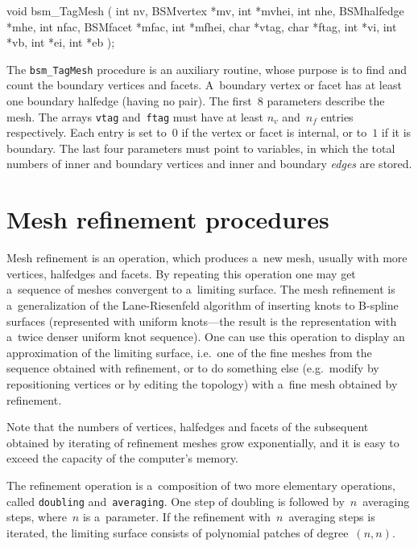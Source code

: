 \medskip
\begin{listingC}
void bsm_TagMesh ( int nv, BSMvertex *mv, int *mvhei,
                   int nhe, BSMhalfedge *mhe,
                   int nfac, BSMfacet *mfac, int *mfhei,
                   char *vtag, char *ftag,
                   int *vi, int *vb, int *ei, int *eb );
\end{listingC}
The \texttt{bsm\_TagMesh} procedure is an auxiliary routine, whose purpose
is to find and count the boundary vertices and facets. A~boundary vertex or
facet has at least one boundary halfedge (having no pair). The first~$8$
parameters describe the mesh. The arrays \texttt{vtag} and~\texttt{ftag}
must have at least $n_v$ and~$n_f$ entries respectively. Each entry is set
to~$0$ if the vertex or facet is internal, or to~$1$ if it is boundary.
The last four parameters must point to variables, in which the total numbers
of inner and boundary vertices and inner and boundary \emph{edges} are stored.


\section{\label{sect:bsmesh:refinement}Mesh refinement procedures}

Mesh refinement is an operation, which produces a~new mesh, usually with
more vertices, halfedges and facets. By repeating this operation one may get
a~sequence of meshes convergent to a~limiting surface. The mesh refinement
is a~generalization of the Lane-Riesenfeld algorithm of inserting knots to
B-spline surfaces (represented with uniform knots---the result is the
representation with a~twice denser uniform knot sequence). One can use this
operation to display an approximation of the limiting surface, i.e.\ one of
the fine meshes from the sequence obtained with refinement, or to do
something else (e.g.\ modify by repositioning vertices or by editing the
topology) with a~fine mesh obtained by refinement.

Note that the numbers of vertices, halfedges and facets of the subsequent
obtained by iterating of refinement meshes grow exponentially, and it is
easy to exceed the capacity of the computer's memory.

The refinement operation is a~composition of two more elementary operations,
called \texttt{doubling} and~\texttt{averaging}. One step of doubling is
followed by~$n$~averaging steps, where~$n$ is a~parameter. If the refinement
with~$n$~averaging steps is iterated, the limiting surface consists of
polynomial patches of degree~$(n,n)$.

